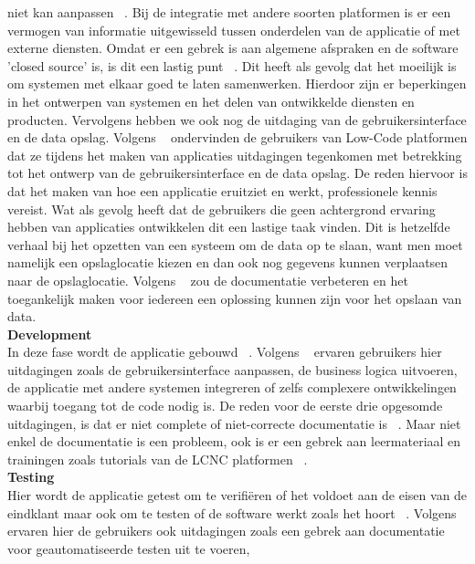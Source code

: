 niet kan aanpassen ~\autocite{Rokis_2022}. Bij de integratie met andere soorten platformen is er een vermogen van informatie uitgewisseld tussen onderdelen van de applicatie 
of met externe diensten. Omdat er een gebrek is aan algemene afspraken en de software 'closed source' is, is dit een lastig punt ~\autocite{Rokis_2022}.
 Dit heeft als gevolg dat het moeilijk is om systemen met elkaar goed te laten samenwerken. 
 Hierdoor zijn er beperkingen in het ontwerpen van systemen en het delen van ontwikkelde diensten en producten. 
 Vervolgens hebben we ook nog de uitdaging van de gebruikersinterface en de data opslag. Volgens ~\textcite{Rokis_2022} 
 ondervinden de gebruikers van Low-Code platformen dat ze tijdens het maken van applicaties uitdagingen tegenkomen met betrekking tot het ontwerp 
 van de gebruikersinterface en de data opslag. De reden hiervoor is dat het maken van hoe een applicatie eruitziet en werkt, professionele kennis vereist. 
 Wat als gevolg heeft dat de gebruikers die geen achtergrond ervaring hebben van applicaties ontwikkelen dit een lastige taak vinden. 
 Dit is hetzelfde verhaal bij het opzetten van een systeem om de data op te slaan, want men moet namelijk een opslaglocatie kiezen en dan ook nog gegevens 
 kunnen verplaatsen naar de opslaglocatie. Volgens ~\textcite{Rokis_2022} zou de documentatie verbeteren en het toegankelijk maken voor iedereen 
 een oplossing kunnen zijn voor het opslaan van data.
\\
\textbf{Development}
\\
In deze fase wordt de applicatie gebouwd ~\autocite{Ghumatkar_2023}. 
Volgens ~\textcite{Rokis_2022} ervaren gebruikers hier uitdagingen zoals de gebruikersinterface aanpassen, de business logica uitvoeren, de applicatie met andere systemen integreren of zelfs complexere ontwikkelingen waarbij toegang tot de code nodig is. 
De reden voor de eerste drie opgesomde uitdagingen, is dat er niet complete of niet-correcte documentatie is ~\autocite{Rokis_2022}. 
Maar niet enkel de documentatie is een probleem, ook is er een gebrek aan leermateriaal en trainingen zoals tutorials van de LCNC platformen ~\autocite{Rokis_2022}.
\\
\textbf{Testing}
\\
Hier wordt de applicatie getest om te verifiëren of het voldoet aan de eisen van de eindklant maar ook om te testen of de software werkt zoals het hoort ~\autocite{Ghumatkar_2023}. 
Volgens ~\textcite{Rokis_2022} ervaren hier de gebruikers ook uitdagingen zoals een gebrek aan documentatie voor geautomatiseerde testen uit te voeren, 
